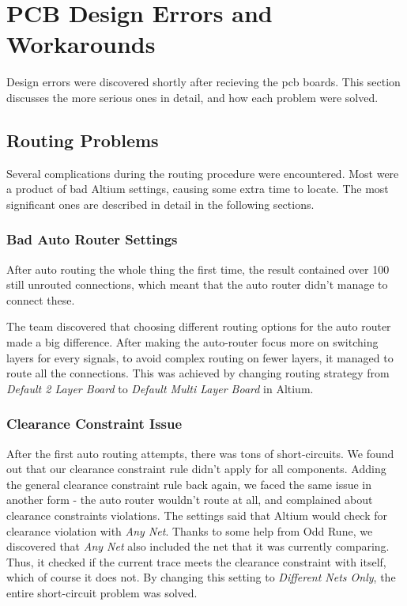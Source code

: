 \section{PCB Design Errors and Workarounds}
Design errors were discovered shortly after recieving the \gls{pcb} boards.
This section discusses the more serious ones in detail, and how each problem were solved.

\subsection{Routing Problems}
\label{Routing Problems}
Several complications during the routing procedure were encountered.
Most were a product of bad Altium settings, causing some extra time to locate.
The most significant ones are described in detail in the following sections.

\subsubsection{Bad Auto Router Settings}
After auto routing the whole thing the first time, the result contained over 100 still unrouted connections,
which meant that the auto router didn't manage to connect these.

The team discovered that choosing different routing options for the auto router made a big difference.
After making the auto-router focus more on switching layers for every signals,
to avoid complex routing on fewer layers, it managed to route all the connections.
This was achieved by changing routing strategy from \emph{Default 2 Layer Board} to \emph{Default Multi Layer Board} in Altium.

\subsubsection{Clearance Constraint Issue}
After the first auto routing attempts, there was tons of short-circuits. We found out that our clearance constraint rule didn't apply for all components.
Adding the general clearance constraint rule back again, we faced the same issue in another form - the auto router wouldn't route at all, and complained about clearance constraints violations.
The settings said that Altium would check for clearance violation with \emph{Any Net}. Thanks to some help from Odd Rune, we discovered that \emph{Any Net} also included the net that it was currently comparing. Thus, it checked if the current trace meets the clearance constraint with itself, which of course it does not. By changing this setting to \emph{Different Nets Only}, the entire short-circuit problem was solved.

